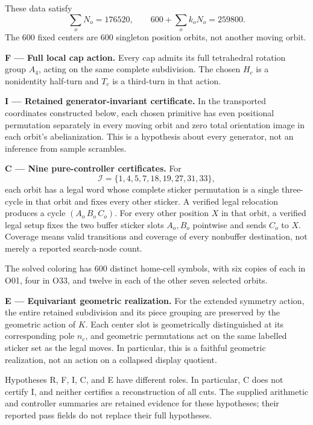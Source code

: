\documentclass[
  10pt,
  a4paper,
]{article}
\begin{document}
These data satisfy \begin{equation}
\sum_oN_o=176520,\qquad
600+\sum_ok_oN_o=259800.
\end{equation} The \(600\) fixed centers are \(600\) singleton position
orbits, not another moving orbit.

\textbf{F --- Full local cap action.} Every cap admits its full
tetrahedral rotation group \(A_4\), acting on the same complete
subdivision. The chosen \(H_c\) is a nonidentity half-turn and \(T_c\)
is a third-turn in that action.

\textbf{I --- Retained generator-invariant certificate.} In the
transported coordinates constructed below, each chosen primitive has
even positional permutation separately in every moving orbit and zero
total orientation image in each orbit's abelianization. This is a
hypothesis about every generator, not an inference from sample
scrambles.

\textbf{C --- Nine pure-controller certificates.} For \begin{equation}
\mathcal I=\{1,4,5,7,18,19,27,31,33\},
\end{equation} each orbit has a legal word whose complete sticker
permutation is a single three-cycle in that orbit and fixes every other
sticker. A verified legal relocation produces a cycle
\((A_o\,B_o\,C_o)\). For every other position \(X\) in that orbit, a
verified legal setup fixes the two buffer sticker slots \(A_o,B_o\)
pointwise and sends \(C_o\) to \(X\). Coverage means valid transitions
and coverage of every nonbuffer destination, not merely a reported
search-node count.

The solved coloring has \(600\) distinct home-cell symbols, with six
copies of each in O01, four in O33, and twelve in each of the other
seven selected orbits.

\textbf{E --- Equivariant geometric realization.} For the extended
symmetry action, the entire retained subdivision and its piece grouping
are preserved by the geometric action of \(K\). Each center slot is
geometrically distinguished at its corresponding pole \(n_c\), and
geometric permutations act on the same labelled sticker set as the legal
moves. In particular, this is a faithful geometric realization, not an
action on a collapsed display quotient.

Hypotheses R, F, I, C, and E have different roles. In particular, C does
not certify I, and neither certifies a reconstruction of all cuts. The
supplied arithmetic and controller summaries are retained evidence for
these hypotheses; their reported pass fields do not replace their full
hypotheses.
\end{document}
